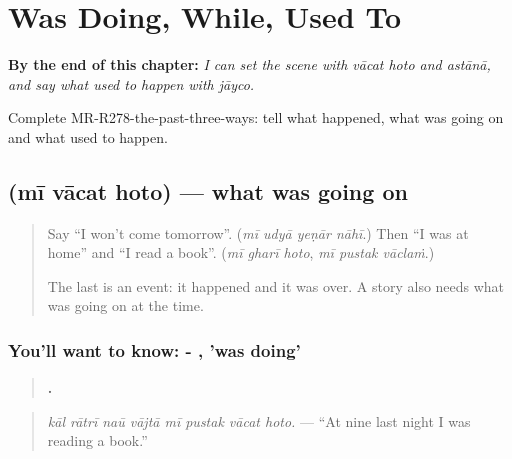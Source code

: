 
\chapter{Was Doing, While, Used To}
\label{ch:mr-was-doing-while-used-to}

\begin{chapteropening}
\textbf{By the end of this chapter:} \emph{I can set the scene with vācat hoto and astānā, and say what used to happen with jāyco.}

Complete MR-R278-the-past-three-ways: tell what happened, what was going on and what used to happen.
\end{chapteropening}

\section[\texorpdfstring{\mr{मी} \mr{वाचत} \mr{होतो} (mī vācat hoto)}{मी वाचत होतो (mī vācat hoto)}]{   (mī vācat hoto) — what was going on}

\label{lesson:MR-C278-vacat-hoto}



\begin{quote}
Say \textquotedblleft{}I won't come tomorrow\textquotedblright{}. (\emph{mī udyā yeṇār nāhī}.) Then \textquotedblleft{}I was at home\textquotedblright{} and \textquotedblleft{}I read a book\textquotedblright{}. (\emph{mī gharī hoto}, \emph{mī pustak vāclaṁ}.)

The last is an event: it happened and it was over. A story also needs what was going on at the time.
\end{quote}

\subsection*{You'll want to know: - , 'was doing'}
\begin{quote}
\textbf{       .}
\end{quote}

\begin{quote}
\emph{kāl rātrī naū vājtā mī pustak vācat hoto.} — \textquotedblleft{}At nine last night I was reading a book.\textquotedblright{}
\end{quote}


